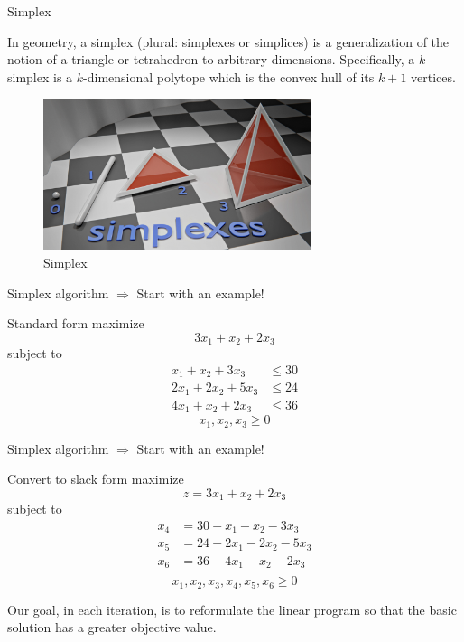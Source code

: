 \begin{frame}{Simplex}

    In geometry, a simplex (plural: simplexes or simplices) is a
    generalization of the notion of a triangle or tetrahedron to arbitrary dimensions.
    Specifically, a $k$-simplex is a $k$-dimensional polytope which is
    the convex hull of its $k + 1$ vertices.

    \begin{figure}
        \includegraphics[width=0.7\textwidth]{assets/simplex.png}
        \caption{Simplex}
    \end{figure}

\end{frame}

\begin{frame}{Simplex algorithm $\Rightarrow$ Start with an example!}

    \begin{block}{Standard form}
        maximize $$3x_1 + x_2 + 2x_3$$
        subject to
        \begin{align*}
            x_1 + x_2 + 3x_3   & \le 30 \\
            2x_1 + 2x_2 + 5x_3 & \le 24 \\
            4x_1 + x_2 + 2x_3  & \le 36
        \end{align*}
        $$x_1, x_2, x_3\ge 0$$
    \end{block}

\end{frame}

\begin{frame}{Simplex algorithm $\Rightarrow$ Start with an example!}

    \begin{block}{Convert to slack form}
        maximize $$z = 3x_1 + x_2 + 2x_3$$
        subject to
        \begin{align*}
            x_4 & = 30 - x_1 - x_2 - 3x_3   \\
            x_5 & = 24 - 2x_1 - 2x_2 - 5x_3 \\
            x_6 & = 36 - 4x_1 - x_2 - 2x_3  \\
        \end{align*}
        $$x_1, x_2, x_3, x_4, x_5, x_6\ge 0$$
    \end{block}

    Our goal, in each iteration, is to reformulate the linear program so that the basic
    solution has a greater objective value.

\end{frame}

